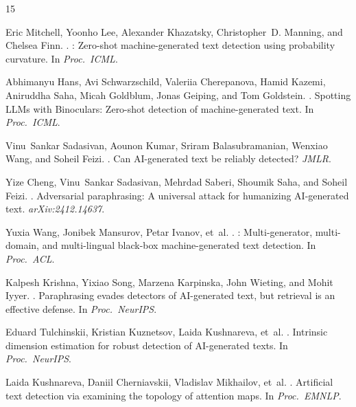 \documentclass[11pt]{article}
\begin{document}



\begin{thebibliography}{15}

Eric Mitchell, Yoonho Lee, Alexander Khazatsky, Christopher~D. Manning, and Chelsea Finn.
.
: Zero-shot machine-generated text detection using probability curvature.
\newblock In \emph{Proc.\ ICML}.

Abhimanyu Hans, Avi Schwarzschild, Valeriia Cherepanova, Hamid Kazemi, Aniruddha Saha, Micah Goldblum, Jonas Geiping, and Tom Goldstein.
.
\newblock Spotting {LLMs} with {Binoculars}: Zero-shot detection of machine-generated text.
\newblock In \emph{Proc.\ ICML}.

Vinu~Sankar Sadasivan, Aounon Kumar, Sriram Balasubramanian, Wenxiao Wang, and Soheil Feizi.
.
\newblock Can {AI}-generated text be reliably detected?
\newblock \emph{JMLR}.

Yize Cheng, Vinu~Sankar Sadasivan, Mehrdad Saberi, Shoumik Saha, and Soheil Feizi.
.
\newblock Adversarial paraphrasing: A universal attack for humanizing {AI}-generated text.
\newblock \emph{arXiv:2412.14637}.

Yuxia Wang, Jonibek Mansurov, Petar Ivanov, et~al.
.
: Multi-generator, multi-domain, and multi-lingual black-box machine-generated text detection.
\newblock In \emph{Proc.\ ACL}.

Kalpesh Krishna, Yixiao Song, Marzena Karpinska, John Wieting, and Mohit Iyyer.
.
\newblock Paraphrasing evades detectors of {AI}-generated text, but retrieval is an effective defense.
\newblock In \emph{Proc.\ NeurIPS}.

Eduard Tulchinskii, Kristian Kuznetsov, Laida Kushnareva, et~al.
.
\newblock Intrinsic dimension estimation for robust detection of {AI}-generated texts.
\newblock In \emph{Proc.\ NeurIPS}.

Laida Kushnareva, Daniil Cherniavskii, Vladislav Mikhailov, et~al.
.
\newblock Artificial text detection via examining the topology of attention maps.
\newblock In \emph{Proc.\ EMNLP}.


\end{thebibliography}
\end{document}
